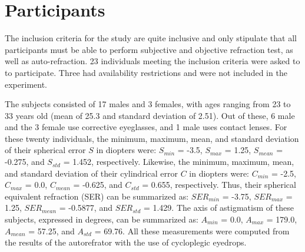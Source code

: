 
\section{Participants}
\label{subsec:Participants}

The inclusion criteria for the study are quite inclusive and only stipulate that all participants must be able to perform subjective and objective refraction test, as well as auto-refraction. 23 individuals meeting the inclusion criteria were asked to to participate. Three had availability restrictions and were not included in the experiment. 

The subjects consisted of 17 males and 3 females, with ages ranging from 23 to 33 years old (mean of 25.3 and standard deviation of 2.51). Out of these, 6 male and the 3 female use corrective eyeglasses, and 1 male uses contact lenses. For these twenty individuals, the minimum, maximum, mean, and standard deviation of their spherical error $S$ in diopters were: $S_{min}$ = -3.5, $S_{max}$ = 1.25, $S_{mean}$ = -0.275, and $S_{std}$ = 1.452, respectively.  Likewise, the minimum, maximum, mean, and standard deviation of their cylindrical error $C$ in diopters were: $C_{min}$ = -2.5, $C_{max}$ = 0.0, $C_{mean}$ = -0.625, and $C_{std}$ = 0.655, respectively. Thus, their spherical equivalent refraction (SER) can be summarized as: $SER_{min}$ = -3.75, $SER_{max}$ = 1.25, $SER_{mean}$ = -0.5877, and $SER_{std}$ = 1.429. The axis of astigmatism of these subjects, expressed in degrees, can be summarized as: $A_{min}$ = 0.0, $A_{max}$ = 179.0, $A_{mean}$ = 57.25, and $A_{std}$ = 69.76.
All these measurements were computed from the results of the autorefrator with the use of cycloplegic eyedrops. 

 
